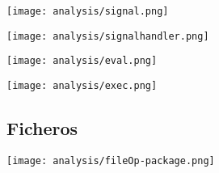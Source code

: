 \pagebreak

\begin{multicols}{2}
\begin{center}
\texttt{[image: analysis/signal.png]} 
\end{center}
\columnbreak
\begin{center}
\texttt{[image: analysis/signalhandler.png]} 
\end{center}
\end{multicols}

\begin{multicols}{2}
\begin{center}
\texttt{[image: analysis/eval.png]} 
\end{center}
\columnbreak
\begin{center}
\texttt{[image: analysis/exec.png]} 
\end{center}
\end{multicols}

\subsection {Ficheros} 
\begin{center}
\texttt{[image: analysis/fileOp-package.png]} 
\end{center}

